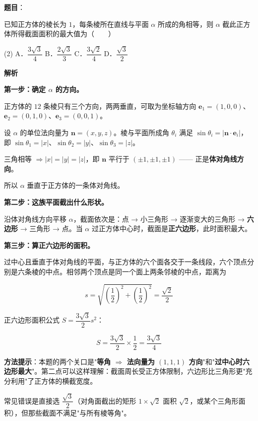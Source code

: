 \begin{answer}

\textbf{题目}：

已知正方体的棱长为 $1$，每条棱所在直线与平面 $\alpha$ 所成的角相等，则 $\alpha$ 截此正方体所得截面面积的最大值为\mbox{（　　）}

\begin{gkopts}(2)
\task A．$\dfrac{3\sqrt3}4$
\task B．$\dfrac{2\sqrt3}3$
\task C．$\dfrac{3\sqrt2}4$
\task D．$\dfrac{\sqrt3}2$
\end{gkopts}

\textbf{解析}

\textbf{第一步：确定 $\alpha$ 的方向。}

正方体的 $12$ 条棱只有三个方向，两两垂直，可取为坐标轴方向 $\boldsymbol e_1=(1,0,0)$、$\boldsymbol e_2=(0,1,0)$、$\boldsymbol e_3=(0,0,1)$。

设 $\alpha$ 的单位法向量为 $\boldsymbol n=(x,y,z)$。棱与平面所成角 $\theta_i$ 满足 $\sin\theta_i=\left|\boldsymbol n\cdot\boldsymbol e_i\right|$，即 $\sin\theta_1=|x|$、$\sin\theta_2=|y|$、$\sin\theta_3=|z|$。

三角相等 $\Rightarrow|x|=|y|=|z|$，即 $\boldsymbol n$ 平行于 $(\pm1,\pm1,\pm1)$ —— 正是\textbf{体对角线方向}。

所以 $\alpha$ 垂直于正方体的一条体对角线。

\textbf{第二步：这族平面截出什么形状。}

沿体对角线方向平移 $\alpha$，截面依次是：点 → 小三角形 → 逐渐变大的三角形 → \textbf{六边形} → 三角形 → 点。当 $\alpha$ 过正方体中心时，截面是\textbf{正六边形}，此时面积最大。

\textbf{第三步：算正六边形的面积。}

过中心且垂直于体对角线的平面，与正方体的六个面各交于一条线段，六个顶点分别是六条棱的中点。相邻两个顶点是同一个面上两条邻棱的中点，距离为

\nopagebreak[4]
\[s=\sqrt{\left(\frac12\right)^{2}+\left(\frac12\right)^{2}}=\frac{\sqrt2}2\]

正六边形面积公式 $S=\dfrac{3\sqrt3}2s^{2}$：

\nopagebreak[4]
\[S=\frac{3\sqrt3}2\times\frac12=\frac{3\sqrt3}4\]

\begin{gktip}
\textbf{方法提示}：本题的两个关口是"\textbf{等角 $\Rightarrow$ 法向量为 $(1,1,1)$ 方向}"和"\textbf{过中心时六边形最大}"。第二点可以这样理解：截面周长受正方体限制，六边形比三角形更"充分利用"了正方体的横截宽度。

常见错误是直接选 $\dfrac{\sqrt3}2$（对角面截出的矩形 $1\times\sqrt2$ 面积 $\sqrt2$，或某个三角形面积），但那些截面不满足"与所有棱等角"。
\end{gktip}


\par\medskip

\end{answer}

